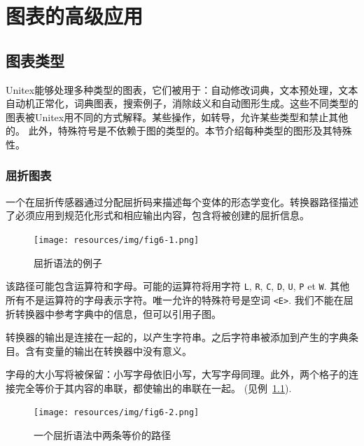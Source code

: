 \chapter{图表的高级应用}
\label{chap-advanced-grammars}
\section{图表类型}
Unitex能够处理多种类型的图表，它们被用于：自动修改词典，文本预处理，文本自动机正常化，词典图表，搜索例子，消除歧义和自动图形生成。这些不同类型的图表被Unitex用不同的方式解释。某些操作，如转导，允许某些类型和禁止其他的。 此外，特殊符号是不依赖于图的类型的。本节介绍每种类型的图形及其特殊性。

\subsection{屈折图表}
一个在屈折传感器通过分配屈折码来描述每个变体的形态学变化。转换器路径描述了必须应用到规范化形式和相应输出内容，包含将被创建的屈折信息。

\bigskip
\begin{figure}[!h]
\begin{center}
\texttt{[image: resources/img/fig6-1.png]}
\caption{屈折语法的例子}
\end{center}
\end{figure}

\noindent 该路径可能包含运算符和字母。可能的运算符将用字符 \verb+L+, \verb+R+, \verb+C+, \verb+D+, \verb+U+, \verb+P+ et
\verb+W+.
其他所有不是运算符的字母表示字符。唯一允许的特殊符号是空词 \verb+<E>+. 我们不能在屈折转换器中参考字典中的信息，但可以引用子图。

\bigskip
\noindent 转换器的输出是连接在一起的，以产生字符串。之后字符串被添加到产生的字典条目。含有变量的输出在转换器中没有意义。


\bigskip
\noindent 字母的大小写将被保留：小写字母依旧小写，大写字母同理。此外，两个格子的连接完全等价于其内容的串联，都使输出的串联在一起。 (见例~\ref{fig-equivalent-inflection-paths}).

\bigskip
\begin{figure}[!h]
\begin{center}
\texttt{[image: resources/img/fig6-2.png]}
\caption{一个屈折语法中两条等价的路径\label{fig-equivalent-inflection-paths}}
\end{center}
\end{figure}

